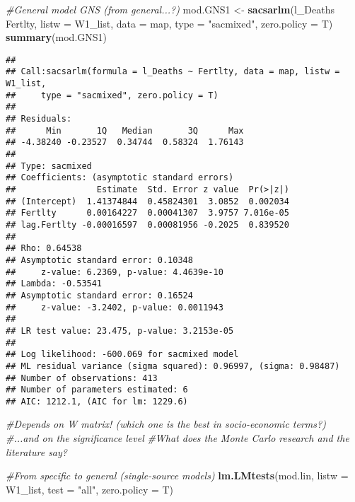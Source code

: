 \documentclass[]{article}
\newenvironment{Shaded}{\begin{snugshade}}{\end{snugshade}}
\newcommand{\KeywordTok}[1]{\textcolor[rgb]{0.13,0.29,0.53}{\textbf{#1}}}
\newcommand{\DataTypeTok}[1]{\textcolor[rgb]{0.13,0.29,0.53}{#1}}
\newcommand{\StringTok}[1]{\textcolor[rgb]{0.31,0.60,0.02}{#1}}
\newcommand{\CommentTok}[1]{\textcolor[rgb]{0.56,0.35,0.01}{\textit{#1}}}
\newcommand{\OperatorTok}[1]{\textcolor[rgb]{0.81,0.36,0.00}{\textbf{#1}}}
\newcommand{\NormalTok}[1]{#1}
\begin{document}
\begin{Shaded}
\begin{Highlighting}[]
\CommentTok{#General model GNS (from general...?)}
\NormalTok{mod.GNS1 <-}\StringTok{ }\KeywordTok{sacsarlm}\NormalTok{(l_Deaths }\OperatorTok{~}\StringTok{ }\NormalTok{Fertlty, }\DataTypeTok{listw =}\NormalTok{ W1_list, }\DataTypeTok{data =}\NormalTok{ map,}
                     \DataTypeTok{type =} \StringTok{"sacmixed"}\NormalTok{, }\DataTypeTok{zero.policy =}\NormalTok{ T)}
\KeywordTok{summary}\NormalTok{(mod.GNS1)}
\end{Highlighting}
\end{Shaded}

\begin{verbatim}
## 
## Call:sacsarlm(formula = l_Deaths ~ Fertlty, data = map, listw = W1_list, 
##     type = "sacmixed", zero.policy = T)
## 
## Residuals:
##      Min       1Q   Median       3Q      Max 
## -4.38240 -0.23527  0.34744  0.58324  1.76143 
## 
## Type: sacmixed 
## Coefficients: (asymptotic standard errors) 
##                Estimate  Std. Error z value  Pr(>|z|)
## (Intercept)  1.41374844  0.45824301  3.0852  0.002034
## Fertlty      0.00164227  0.00041307  3.9757 7.016e-05
## lag.Fertlty -0.00016597  0.00081956 -0.2025  0.839520
## 
## Rho: 0.64538
## Asymptotic standard error: 0.10348
##     z-value: 6.2369, p-value: 4.4639e-10
## Lambda: -0.53541
## Asymptotic standard error: 0.16524
##     z-value: -3.2402, p-value: 0.0011943
## 
## LR test value: 23.475, p-value: 3.2153e-05
## 
## Log likelihood: -600.069 for sacmixed model
## ML residual variance (sigma squared): 0.96997, (sigma: 0.98487)
## Number of observations: 413 
## Number of parameters estimated: 6 
## AIC: 1212.1, (AIC for lm: 1229.6)
\end{verbatim}

\begin{Shaded}
\begin{Highlighting}[]
\CommentTok{#Depends on W matrix! (which one is the best in socio-economic terms?)}
\CommentTok{#...and on the significance level}
\CommentTok{#What does the Monte Carlo research and the literature say?}


\CommentTok{#From specific to general (single-source models)}
\KeywordTok{lm.LMtests}\NormalTok{(mod.lin, }\DataTypeTok{listw =}\NormalTok{ W1_list, }\DataTypeTok{test =} \StringTok{"all"}\NormalTok{, }\DataTypeTok{zero.policy =}\NormalTok{ T)}
\end{Highlighting}
\end{Shaded}
\end{document}
